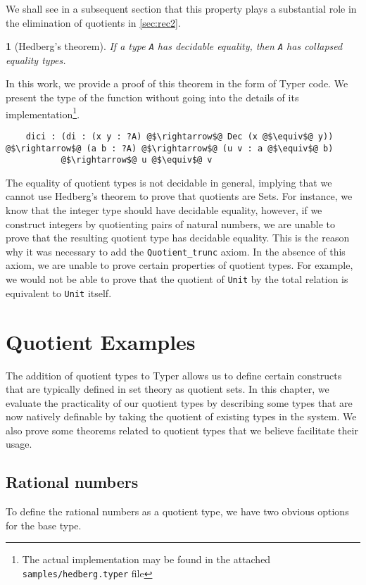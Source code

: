 \documentclass[12pt,twoside,maitrise]{dms}
\newtheorem{theo}[cor]{\theoremname}
\theoremstyle{definition}
\numberwithin{equation}{section}
\numberwithin{table}{chapter}
\numberwithin{figure}{chapter}
\newcommand\id[1] {\texttt{#1}}
\newcommand\fn[1] {\texttt{#1}}
\begin{document}
We shall see in a subsequent section that this property plays a substantial role
in the elimination of quotients in \autoref{sec:rec2}.

\begin{theo}[Hedberg's theorem\cite{hedberg1998coherence}]
If a type \fn{A} has decidable equality, then \fn{A} has collapsed equality
types.
\end{theo}

In this work, we provide a proof of this theorem in the form of Typer code. We
present the type of the function without going into the details of its
implementation\footnote{The actual implementation may be found in the attached \fn{samples/hedberg.typer} file}.

\begin{verbatim}
    dici : (di : (x y : ?A) @$\rightarrow$@ Dec (x @$\equiv$@ y)) @$\rightarrow$@ (a b : ?A) @$\rightarrow$@ (u v : a @$\equiv$@ b)
           @$\rightarrow$@ u @$\equiv$@ v
\end{verbatim}

The equality of quotient types is not decidable in general, implying that we
cannot use Hedberg's theorem to prove that quotients are Sets. For instance, we
know that the integer type should have decidable equality, however, if we
construct integers by quotienting pairs of natural numbers, we are unable to
prove that the resulting quotient type has decidable equality. This is the
reason why it was necessary to add the \id{Quotient\_trunc} axiom. In the
absence of this axiom, we are unable to prove certain properties of quotient
types. For example, we would not be able to prove that the quotient of \id{Unit}
by the total relation is equivalent to \id{Unit}
itself\cite{vezzosi2021cubical}.

\chapter{Quotient Examples}\label{ch:quot-examples}
The addition of quotient types to Typer allows us to define certain constructs
that are typically defined in set theory as quotient sets. In this chapter, we
evaluate the practicality of our quotient types by describing some types that
are now natively definable by taking the quotient of existing types in the
system. We also prove some theorems related to quotient types that we believe
facilitate their usage.

\section{Rational numbers}
To define the rational numbers as a quotient type, we have two obvious options for the base type.
\end{document}
